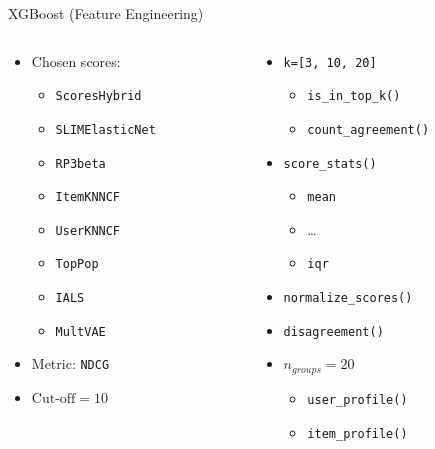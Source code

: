 \documentclass{beamer}
\begin{document}
\begin{frame}{XGBoost (Feature Engineering)}
  \begin{columns}[t]
    \begin{column}{0.5\textwidth}
      \begin{itemize}
        \item Chosen scores:
        \begin{itemize}
          \item \texttt{ScoresHybrid}
          \item \texttt{SLIMElasticNet}
          \item \texttt{RP3beta}
          \item \texttt{ItemKNNCF}
          \item \texttt{UserKNNCF}
          \item \texttt{TopPop}
          \item \texttt{IALS}
          \item \texttt{MultVAE}
        \end{itemize}
        \item Metric: \texttt{NDCG}
        \item $\text{Cut-off}=10$
      \end{itemize}
    \end{column}

    \begin{column}{0.5\textwidth}
      \begin{itemize}
        \item \lstinline{k=[3, 10, 20]}
        \begin{itemize}
          \item \texttt{is\_in\_top\_k()}
          \item \texttt{count\_agreement()}
        \end{itemize}
        \item \texttt{score\_stats()}
        \begin{itemize}
          \item \texttt{mean}
          \item \ldots
          \item \texttt{iqr}
        \end{itemize}
        \item \texttt{normalize\_scores()}
        \item \texttt{disagreement()}
        \item $n_{groups}=20$
        \begin{itemize}
          \item \texttt{user\_profile()}
          \item \texttt{item\_profile()}
        \end{itemize}
      \end{itemize}
    \end{column}
  \end{columns}
\end{frame}
\end{document}

